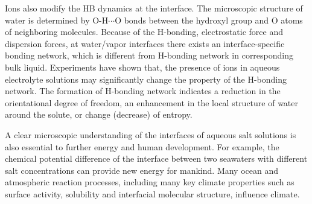 Ions also modify the HB dynamics at the interface\cite{Raymond2004,McLain2006,Ball2008}.
The microscopic structure of water is determined by O-H$\cdots$O bonds between the hydroxyl group 
and O atoms of neighboring molecules. 
Because of the H-bonding, electrostatic force and dispersion forces, 
at water/vapor interfaces there exists an interface-specific bonding network\cite{Eisenberg1969,Speedy1976,Poole1994,Soper2008b,Ball2001,Nilsson2011,Pettersson2015}, 
which is different from H-bonding network in corresponding bulk liquid\cite{Allongue96,Velasco-Velez14}.
Experiments have shown that, the presence of ions in aqueous 
electrolyte solutions may significantly change the property of the H-bonding network. 
The formation of H-bonding network indicates a reduction in the orientational degree of freedom, 
an enhancement in the local structure of water around the solute, or change (decrease) of entropy\cite{Frank45a, Frank45b,Frank45c}.
%


A clear microscopic understanding of the interfaces of aqueous salt solutions is also essential to further energy and human development. 
For example, the chemical potential difference of the interface between two seawaters with different salt concentrations can provide new energy for mankind\cite{Pattle1954,Loeb1976}. 
Many ocean and atmospheric reaction processes, including many key climate properties such as surface activity, 
solubility and interfacial molecular structure, influence climate\cite{Schill2015,Cochran2017}. 

